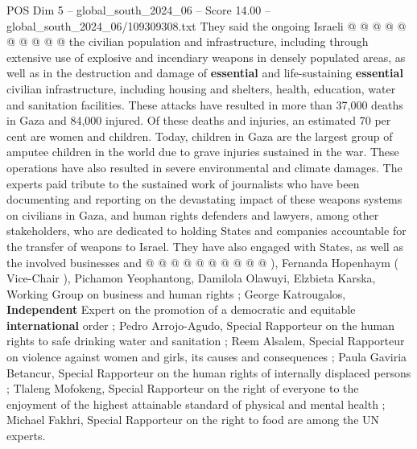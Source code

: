 \begin{textsample}{POS Dim 5 – global\_south\_2024\_06 – Score 14.00 – global\_south\_2024\_06/109309308.txt}
They said the ongoing Israeli @ @ @ @ @ @ @ @ @ @ the civilian population and infrastructure, including through extensive use of explosive and incendiary weapons in densely populated areas, as well as in the destruction and damage of \textbf{essential} and life-sustaining \textbf{essential} civilian infrastructure, including housing and shelters, health, education, water and sanitation facilities.
These attacks have resulted in more than 37,000 deaths in Gaza and 84,000 injured.
Of these deaths and injuries, an estimated 70 per cent are women and children.
Today, children in Gaza are the largest group of amputee children in the world due to grave injuries sustained in the war.
These operations have also resulted in severe environmental and climate damages.
The experts paid tribute to the sustained work of journalists who have been documenting and reporting on the devastating impact of these weapons systems on civilians in Gaza, and human rights defenders and lawyers, among other stakeholders, who are dedicated to holding States and companies accountable for the transfer of weapons to Israel.
They have also engaged with States, as well as the involved businesses and @ @ @ @ @ @ @ @ @ @ ), Fernanda Hopenhaym ( Vice-Chair ), Pichamon Yeophantong, Damilola Olawuyi, Elzbieta Karska, Working Group on business and human rights ; George Katrougalos, \textbf{Independent} Expert on the promotion of a democratic and equitable \textbf{international} order ; Pedro Arrojo-Agudo, Special Rapporteur on the human rights to safe drinking water and sanitation ; Reem Alsalem, Special Rapporteur on violence against women and girls, its causes and consequences ; Paula Gaviria Betancur, Special Rapporteur on the human rights of internally displaced persons ; Tlaleng Mofokeng, Special Rapporteur on the right of everyone to the enjoyment of the highest attainable standard of physical and mental health ; Michael Fakhri, Special Rapporteur on the right to food are among the UN experts.

\end{textsample}
